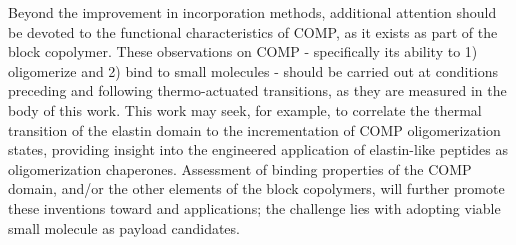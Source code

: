 \begin{refsection}
Beyond the improvement in incorporation methods, additional attention should be
devoted to the functional characteristics of COMP, as it exists as part of the
block copolymer. These observations on COMP - specifically its ability to 1)
oligomerize and 2) bind to small molecules - should be carried out at conditions
preceding and following thermo-actuated transitions, as they are measured in the
body of this work. This work may seek, for example, to correlate the thermal
transition of the elastin domain to the incrementation of COMP oligomerization
states, providing insight into the engineered application of elastin-like
peptides as oligomerization chaperones. Assessment of binding properties of the
COMP domain, and/or the other elements of the block copolymers, will further
promote these inventions toward  and 
applications; the challenge lies with adopting viable small molecule as payload
candidates.

\printbibliography[heading=subbibliography]

\end{refsection}

